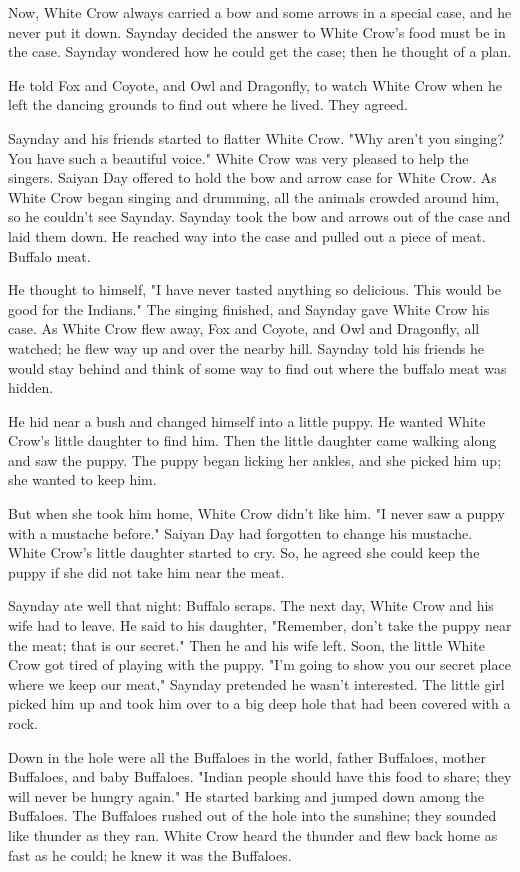 Now, White Crow always carried a bow and some arrows in a special case, and he never put it down. Saynday decided the answer to White Crow's food must be in the case. Saynday wondered how he could get the case; then he thought of a plan.

He told Fox and Coyote, and Owl and Dragonfly, to watch White Crow when he left the dancing grounds to find out where he lived. They agreed.

Saynday and his friends started to flatter White Crow. "Why aren't you singing? You have such a beautiful voice." White Crow was very pleased to help the singers. Saiyan Day offered to hold the bow and arrow case for White Crow. As White Crow began singing and drumming, all the animals crowded around him, so he couldn't see Saynday. Saynday took the bow and arrows out of the case and laid them down. He reached way into the case and pulled out a piece of meat. Buffalo meat.

He thought to himself, "I have never tasted anything so delicious. This would be good for the Indians." The singing finished, and Saynday gave White Crow his case. As White Crow flew away, Fox and Coyote, and Owl and Dragonfly, all watched; he flew way up and over the nearby hill. Saynday told his friends he would stay behind and think of some way to find out where the buffalo meat was hidden.

He hid near a bush and changed himself into a little puppy. He wanted White Crow's little daughter to find him. Then the little daughter came walking along and saw the puppy. The puppy began licking her ankles, and she picked him up; she wanted to keep him.

But when she took him home, White Crow didn't like him. "I never saw a puppy with a mustache before." Saiyan Day had forgotten to change his mustache. White Crow's little daughter started to cry. So, he agreed she could keep the puppy if she did not take him near the meat.

Saynday ate well that night: Buffalo scraps. The next day, White Crow and his wife had to leave. He said to his daughter, "Remember, don't take the puppy near the meat; that is our secret." Then he and his wife left. Soon, the little White Crow got tired of playing with the puppy. "I'm going to show you our secret place where we keep our meat," Saynday pretended he wasn't interested. The little girl picked him up and took him over to a big deep hole that had been covered with a rock.

Down in the hole were all the Buffaloes in the world, father Buffaloes, mother Buffaloes, and baby Buffaloes. "Indian people should have this food to share; they will never be hungry again." He started barking and jumped down among the Buffaloes. The Buffaloes rushed out of the hole into the sunshine; they sounded like thunder as they ran. White Crow heard the thunder and flew back home as fast as he could; he knew it was the Buffaloes.

